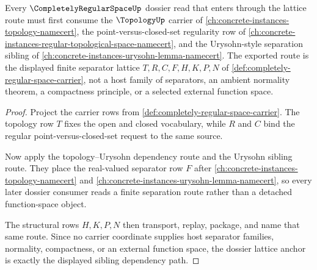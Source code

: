 \begin{theorem}
\label{thm:completely-regular-space-dossier-lattice-anchor}
Every $\CompletelyRegularSpaceUp$ dossier read that enters through the lattice route must first consume the $\TopologyUp$ carrier of \autoref{ch:concrete-instances-topology-namecert}, the point-versus-closed-set regularity row of \autoref{ch:concrete-instances-regular-topological-space-namecert}, and the Urysohn-style separation sibling of \autoref{ch:concrete-instances-urysohn-lemma-namecert}. The exported route is the displayed finite separator lattice $T,R,C,F,H,K,P,N$ of \autoref{def:completely-regular-space-carrier}, not a host family of separators, an ambient normality theorem, a compactness principle, or a selected external function space.
\end{theorem}
\begin{proof}
Project the carrier rows from \autoref{def:completely-regular-space-carrier}. The topology row $T$ fixes the open and closed vocabulary, while $R$ and $C$ bind the regular point-versus-closed-set request to the same source.

Now apply the topology--Urysohn dependency route and the Urysohn sibling route. They place the real-valued separator row $F$ after \autoref{ch:concrete-instances-topology-namecert} and \autoref{ch:concrete-instances-urysohn-lemma-namecert}, so every later dossier consumer reads a finite separation route rather than a detached function-space object.

The structural rows $H,K,P,N$ then transport, replay, package, and name that same route. Since no carrier coordinate supplies host separator families, normality, compactness, or an external function space, the dossier lattice anchor is exactly the displayed sibling dependency path.
\end{proof}
